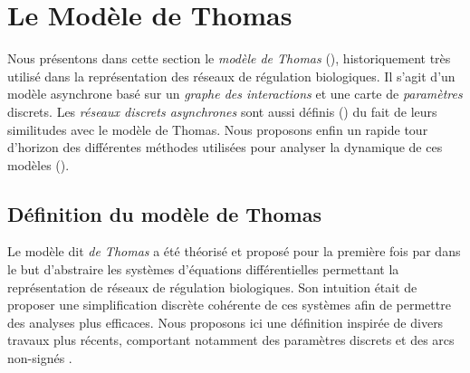 
\section{Le Modèle de Thomas}

Nous présentons dans cette section le \emph{modèle de Thomas} (),
historiquement très utilisé dans la représentation des réseaux de régulation biologiques.
Il s'agit d'un modèle asynchrone basé sur un \emph{graphe des interactions} et
une carte de \emph{paramètres} discrets.
Les \emph{réseaux discrets asynchrones} sont aussi définis ()
du fait de leurs similitudes avec le modèle de Thomas.
Nous proposons enfin un rapide tour d'horizon des différentes méthodes utilisées
pour analyser la dynamique de ces modèles ().

\subsection{Définition du modèle de Thomas}

Le modèle dit \emph{de Thomas} a été théorisé et proposé pour la première
fois par  dans le but d'abstraire les systèmes
d'équations différentielles permettant la représentation de réseaux de régulation biologiques.
Son intuition était de proposer une simplification discrète cohérente de ces systèmes
afin de permettre des analyses plus efficaces.
Nous proposons ici une définition inspirée de divers travaux plus récents,
comportant notamment des paramètres discrets \cite{Snoussi89}
et des arcs non-signés \cite{FPIMR12-CMSB}.

\myskip


